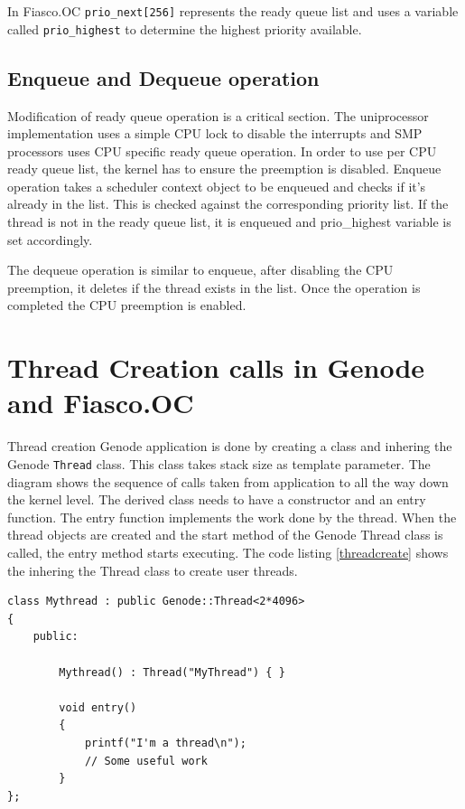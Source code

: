 In Fiasco.OC \texttt{prio\_next[256]} represents the ready queue list and uses a variable called \texttt{prio\_highest} to determine the highest priority available.  

\subsection{Enqueue and Dequeue operation}	
Modification of ready queue operation is a critical section. The uniprocessor implementation uses a simple CPU lock to disable the interrupts and SMP processors uses CPU specific ready queue operation. In order to use per CPU ready queue list, the kernel has to ensure the preemption is disabled. Enqueue operation takes a scheduler context object to be enqueued and checks if it's already in the list. This is checked against the corresponding priority list. If the thread is not in the ready queue list, it is enqueued and prio\_highest variable is set accordingly. 

The dequeue operation is similar to enqueue, after disabling the CPU preemption, it deletes if the thread exists in the list. Once the operation is completed the CPU preemption is enabled.

\section{Thread Creation calls in Genode and Fiasco.OC}
Thread creation Genode application is done by creating a class and inhering the Genode \texttt{Thread} class. This class takes stack size as template parameter. The diagram %
shows the sequence of calls taken from application to all the way down the kernel level.  
The derived class needs to have a constructor and an entry function. The entry function implements the work done by the thread. When the thread objects are created and the start method of the Genode Thread class is called, the entry method starts executing. The code listing \ref{threadcreate} shows the inhering the Thread class to create user threads.

\begin{lstlisting}[caption={Thread creation class},label={threadcreate}, style=customcpp]
class Mythread : public Genode::Thread<2*4096>
{
	public:

		Mythread() : Thread("MyThread") { }

		void entry()
		{
			printf("I'm a thread\n");
			// Some useful work
		}
};
\end{lstlisting}

